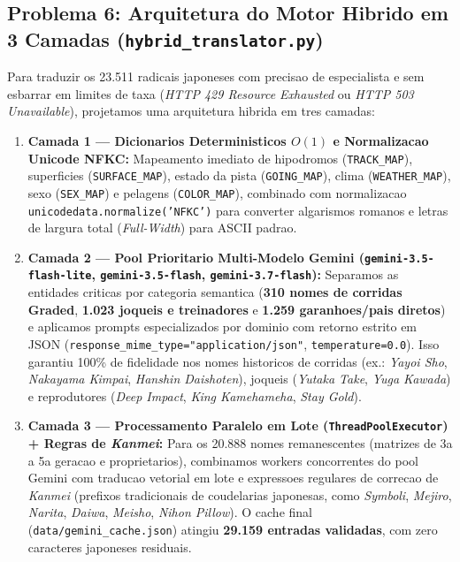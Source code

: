 \documentclass[12pt,a4paper]{article}
\begin{document}
\subsection{Problema 6: Arquitetura do Motor Hibrido em 3 Camadas (\texttt{hybrid\_translator.py})}
Para traduzir os 23.511 radicais japoneses com precisao de especialista e sem esbarrar em limites de taxa (\textit{HTTP 429 Resource Exhausted} ou \textit{HTTP 503 Unavailable}), projetamos uma arquitetura hibrida em tres camadas:
\begin{enumerate}
    \item \textbf{Camada 1 --- Dicionarios Deterministicos $O(1)$ e Normalizacao Unicode NFKC:} Mapeamento imediato de hipodromos (\texttt{TRACK\_MAP}), superficies (\texttt{SURFACE\_MAP}), estado da pista (\texttt{GOING\_MAP}), clima (\texttt{WEATHER\_MAP}), sexo (\texttt{SEX\_MAP}) e pelagens (\texttt{COLOR\_MAP}), combinado com normalizacao \texttt{unicodedata.normalize('NFKC')} para converter algarismos romanos e letras de largura total (\textit{Full-Width}) para ASCII padrao.
    \item \textbf{Camada 2 --- Pool Prioritario Multi-Modelo Gemini (\texttt{gemini-3.5-flash-lite}, \texttt{gemini-3.5-flash}, \texttt{gemini-3.7-flash}):} Separamos as entidades criticas por categoria semantica (\textbf{310 nomes de corridas Graded}, \textbf{1.023 joqueis e treinadores} e \textbf{1.259 garanhoes/pais diretos}) e aplicamos prompts especializados por dominio com retorno estrito em JSON (\texttt{response\_mime\_type="application/json"}, \texttt{temperature=0.0}). Isso garantiu 100\% de fidelidade nos nomes historicos de corridas (ex.: \textit{Yayoi Sho}, \textit{Nakayama Kimpai}, \textit{Hanshin Daishoten}), joqueis (\textit{Yutaka Take}, \textit{Yuga Kawada}) e reprodutores (\textit{Deep Impact}, \textit{King Kamehameha}, \textit{Stay Gold}).
    \item \textbf{Camada 3 --- Processamento Paralelo em Lote (\texttt{ThreadPoolExecutor}) + Regras de \textit{Kanmei}:} Para os 20.888 nomes remanescentes (matrizes de 3a a 5a geracao e proprietarios), combinamos workers concorrentes do pool Gemini com traducao vetorial em lote e expressoes regulares de correcao de \textit{Kanmei} (prefixos tradicionais de coudelarias japonesas, como \textit{Symboli}, \textit{Mejiro}, \textit{Narita}, \textit{Daiwa}, \textit{Meisho}, \textit{Nihon Pillow}). O cache final (\texttt{data/gemini\_cache.json}) atingiu \textbf{29.159 entradas validadas}, com zero caracteres japoneses residuais.
\end{enumerate}
\end{document}
